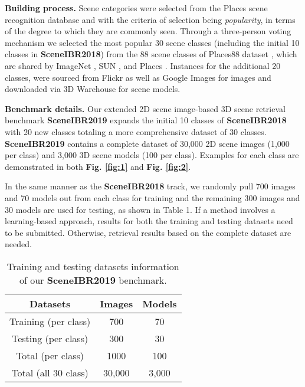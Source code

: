 \documentclass[../main.tex]{subfiles}
\begin{document}
\textbf{Building process.} 
Scene categories were selected from the Places scene 
recognition database \cite{zhou2017places} and with the 
criteria of selection being \textit{popularity}, in terms 
of the degree to which they are commonly seen. Through a 
three-person voting mechanism we selected the most 
popular 30 scene classes (including the initial 10 
classes in \textbf{SceneIBR2018}) from the 88 scene 
classes of Places88 dataset \cite{Places88}, which are 
shared by ImageNet \cite{ImageNet}, SUN \cite{SUN}, and 
Places \cite{zhou2017places}. 
Instances for the additional 20 classes, were sourced from Flickr \cite{Flickr} as well as Google Images\cite{GoogleImages} for images and downloaded via 3D Warehouse \cite{3DWarehouse} for scene models. 

\textbf{Benchmark details.} Our extended 2D scene image-based 3D scene retrieval benchmark \textbf{SceneIBR2019} expands the initial 10 classes of \textbf{SceneIBR2018} with 20 new classes totaling a more comprehensive dataset of 30 classes. \textbf{SceneIBR2019} contains a complete dataset of 30,000 2D scene images (1,000 per class) and 3,000 3D scene models (100 per class). Examples for each class are demonstrated in both \textbf{Fig. \ref{fig:1}} and \textbf{Fig. \ref{fig:2}}.

In the same manner as the \textbf{SceneIBR2018} track, we randomly pull 700 images and 70 models out from each class for training and the remaining 300 images and 30 models are used for testing, as shown in Table 1. If a method involves a learning-based approach, results for both the training and testing datasets need to be submitted. Otherwise, retrieval results based on the complete dataset are needed.


\begin{table}[h]
	\centering
	\caption{Training and testing datasets information of our \textbf{SceneIBR2019} benchmark.}
	\begin{center}
		\begin{tabular}  {|c|c|c|}
			\hline
			\textbf{\normalsize{Datasets}} & \textbf{\normalsize{Images}} & \textbf{\normalsize{Models}}\\
			\hline
			\normalsize{Training (per class)}  & 700  & 70  \\
			\hline
			\normalsize{Testing (per class)}  & 300  & 30  \\
			\hline
			\normalsize{Total (per class)}  & 1000  & 100  \\
			\hline
			\normalsize{Total (all 30 class)}  & 30,000  & 3,000  \\
			\hline
		\end{tabular}
	\end{center}
	\label{table1}
\end{table}
\end{document}
